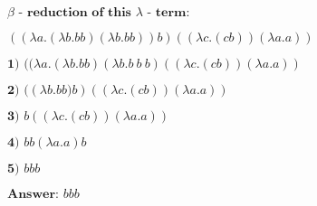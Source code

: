 \documentclass[a4paper,17pt]{extarticle}
\begin{document}
$\beta \textbf{ - reduction of this } \lambda \textbf{ - term:}$ \newline

$
((\lambda a.(\lambda b.b b) (\lambda b.b b)) b) ((\lambda c.(c b)) (\lambda a.a))$ \newline

$\textbf{1) } (( \lambda a.(\lambda b.b b) (\lambda b.b\:b\:b) ((\lambda c.(c b)) (\lambda a.a))$ \newline

$\textbf{2) } ((\lambda b.b b\textbf{)} b) ((\lambda c.(c b)) (\lambda a.a))$ \newline

$\textbf{3) } b ((\lambda c.(c b)) (\lambda a.a))$ \newline

$\textbf{4) } b b (\lambda a.a) b$ \newline

$\textbf{5) } b b b$ \newline

$\textbf{Answer: } b b b$ 
\end{document}
